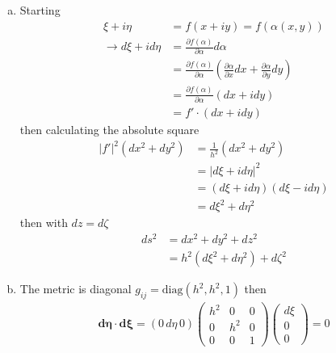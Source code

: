 \documentclass[../main.tex]{subfiles}
\begin{document}
\begin{enumerate}[a.]
\item Starting
\begin{align}
\xi+i\eta&=f(x+iy)=f(\alpha(x,y))\\
\rightarrow d\xi+id\eta
&=\frac{\partial f(\alpha)}{\partial\alpha}d\alpha\\
&=\frac{\partial f(\alpha)}{\partial\alpha}\left(\frac{\partial\alpha}{\partial x}dx+\frac{\partial\alpha}{\partial y}dy\right)\\
&=\frac{\partial f(\alpha)}{\partial\alpha}\left(dx+idy\right)\\
&=f'\cdot\left(dx+idy\right)
\end{align}
then calculating the absolute square
\begin{align}
|f'|^2(dx^2+dy^2)&=\frac{1}{h^2}(dx^2+dy^2)\\
&=|d\xi+id\eta|^2\\
&=(d\xi+id\eta)(d\xi-id\eta)\\
&=d\xi^2+d\eta^2
\end{align}
then with $dz=d\zeta$
\begin{align}
ds^2&=dx^2+dy^2+dz^2\\
&=h^2(d\xi^2+d\eta^2)+d\zeta^2
\end{align}

\item The metric is diagonal $g_{ij}=\text{diag}(h^2,h^2,1)$ then
\begin{align}
\mathbf{d\eta}\cdot\mathbf{d\xi}
=(0\,d\eta\,0)\left(\begin{array}{ccc}
h^2 & 0   & 0\\
0   & h^2 & 0\\
0   & 0   & 1
\end{array}\right)
\left(\begin{array}{c}
d\xi\\
0  \\
0  
\end{array}\right)=0
\end{align}


\end{enumerate}
\end{document}
